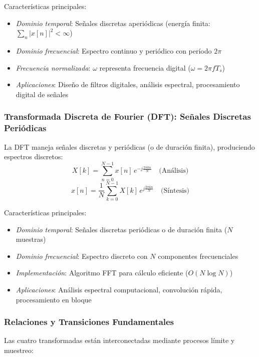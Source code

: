\documentclass[
  11pt,
  letterpaper,
   addpoints,
   answers
  ]{exam}
\begin{document}
Características principales:
\begin{itemize}
\item \textit{Dominio temporal}: Señales discretas aperiódicas (energía finita: \(\sum_{n} |x[n]|^2 < \infty\))
\item \textit{Dominio frecuencial}: Espectro continuo y periódico con período \(2\pi\)
\item \textit{Frecuencia normalizada}: \(\omega\) representa frecuencia digital (\(\omega = 2\pi f T_s\))
\item \textit{Aplicaciones}: Diseño de filtros digitales, análisis espectral, procesamiento digital de señales
\end{itemize}

\subsubsection*{Transformada Discreta de Fourier (DFT): Señales Discretas Periódicas}
La DFT maneja señales discretas y periódicas (o de duración finita), produciendo espectros discretos:
\begin{equation}
X[k] = \sum_{n=0}^{N-1} x[n]\,e^{-j\frac{2\pi kn}{N}} \quad \text{(Análisis)}
\end{equation}
\begin{equation}
x[n] = \frac{1}{N}\sum_{k=0}^{N-1} X[k]\,e^{j\frac{2\pi kn}{N}} \quad \text{(Síntesis)}
\end{equation}

Características principales:
\begin{itemize}
\item \textit{Dominio temporal}: Señales discretas periódicas o de duración finita (\(N\) muestras)
\item \textit{Dominio frecuencial}: Espectro discreto con \(N\) componentes frecuenciales
\item \textit{Implementación}: Algoritmo FFT para cálculo eficiente (\(O(N \log N)\))
\item \textit{Aplicaciones}: Análisis espectral computacional, convolución rápida, procesamiento en bloque
\end{itemize}

\subsubsection*{Relaciones y Transiciones Fundamentales}
Las cuatro transformadas están interconectadas mediante procesos límite y muestreo:
\end{document}
